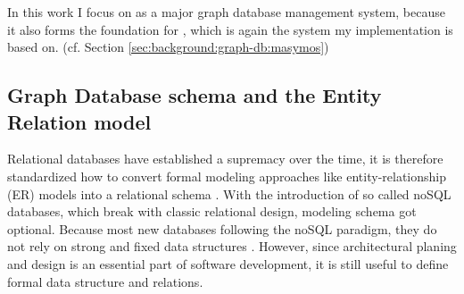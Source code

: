 In this work I focus on \neoj as a major graph database management system, because it also forms the foundation for \masymos, which is again the system my implementation is based on. (cf. Section \ref{sec:background:graph-db:masymos})

\subsection{Graph Database schema and the Entity Relation model}
\label{sec:background:graph-db:er}
Relational databases have established a supremacy over the time, it is therefore standardized how to convert formal modeling approaches like entity-relationship (ER) models into a relational schema \citep{Saake2010,Teorey1986}. With the introduction of so called noSQL databases, which break with classic relational design, modeling schema got optional. Because most new databases following the noSQL paradigm, they do not rely on strong and fixed data structures \citep{Tudorica2011}.
However, since architectural planing and design is an essential part of software development, it is still useful to define formal data structure and relations.

